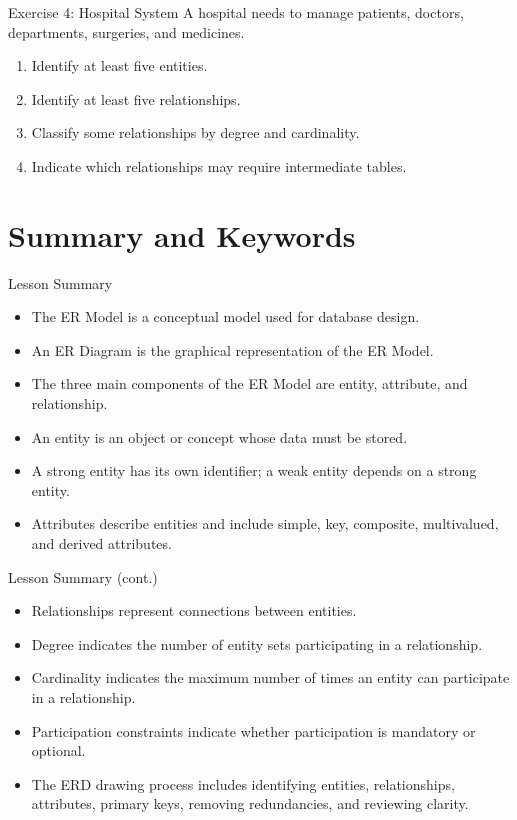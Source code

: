 \documentclass[aspectratio=169,11pt]{beamer}
\newcommand{\smallitem}{\setlength{\itemsep}{2pt}\setlength{\parskip}{0pt}}
\begin{document}
\begin{frame}{Exercise 4: Hospital System}
\small
A hospital needs to manage patients, doctors, departments, surgeries, and medicines.

\vspace{2mm}
\begin{enumerate}
\smallitem
  \item Identify at least five entities.
  \item Identify at least five relationships.
  \item Classify some relationships by degree and cardinality.
  \item Indicate which relationships may require intermediate tables.
\end{enumerate}
\end{frame}

\section{Summary and Keywords}

\begin{frame}{Lesson Summary}
\small
\begin{itemize}
\smallitem
  \item The ER Model is a conceptual model used for database design.
  \item An ER Diagram is the graphical representation of the ER Model.
  \item The three main components of the ER Model are entity, attribute, and relationship.
  \item An entity is an object or concept whose data must be stored.
  \item A strong entity has its own identifier; a weak entity depends on a strong entity.
  \item Attributes describe entities and include simple, key, composite, multivalued, and derived attributes.
\end{itemize}
\end{frame}

\begin{frame}{Lesson Summary (cont.)}
\small
\begin{itemize}
\smallitem
  \item Relationships represent connections between entities.
  \item Degree indicates the number of entity sets participating in a relationship.
  \item Cardinality indicates the maximum number of times an entity can participate in a relationship.
  \item Participation constraints indicate whether participation is mandatory or optional.
  \item The ERD drawing process includes identifying entities, relationships, attributes, primary keys, removing redundancies, and reviewing clarity.
\end{itemize}
\end{frame}
\end{document}
